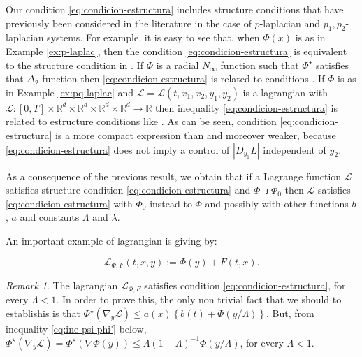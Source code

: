 \documentclass[twoside]{article}
\theoremstyle{remark}
\newtheorem{comentario}{Remark}
\newcounter{example}[section]
\newcommand{\rr}{\mathbb{R}}
\renewcommand{\leq}{\leqslant}
\begin{document}
Our condition \eqref{eq:condicion-estructura} includes structure conditions that have previously been considered in the literature in the case of $p$-laplacian and $p_1,p_2$-laplacian systems. For example, it is easy to see that, when $\Phi(x)$ is as in Example \ref{ex:p-laplac}, then  the condition \eqref{eq:condicion-estructura}  is equivalent to the structure condition in  \cite[Th. 1.4]{mawhin2010critical}.  If $\Phi$ is a radial $N_{\infty}$ function such that $\Phi^{\star}$ satisfies that $\Delta_2$ function  then \eqref{eq:condicion-estructura} is related to conditions  \cite[Eq. (2)-(4)]{ABGMS2015}.   If $\Phi$ is as in Example \ref{ex:pq-laplac} and $\mathcal{L}=\mathcal{L}(t,x_1,x_2,y_1,y_2)$ is a lagrangian with $\mathcal{L}:[0,T]\times\rr^d\times\rr^d\times\rr^d\times\rr^d\to\rr$ then inequality \eqref{eq:condicion-estructura} is related to estructure conditions like
\cite[Lemma 3.1, Eq. (3.1)]{Tian2007192}. As can be seen, condition \eqref{eq:condicion-estructura} is a more compact expression than \cite[Lemma 3.1, Eq. (3.1)]{Tian2007192} and moreover   weaker, because  \eqref{eq:condicion-estructura} does not imply a control of
$|D_{y_1}L|$ independent of $y_2$. 



As a consequence of the previous result, we obtain that if a Lagrange function $\mathcal{L}$ satisfies structure condition \eqref{eq:condicion-estructura} and $\Phi\strictif \Phi_0$ then $\mathcal{L}$ satisfies \eqref{eq:condicion-estructura} with $\Phi_0$ instead to $\Phi$ and possibly with other functions $b$, $a$ and constants $\Lambda$ and $\lambda$.


An important example of lagrangian  is giving by:

\begin{equation}\label{eq:lagrange_phi}
\mathcal{L}_{\Phi,F}(t,x,y):=\Phi(y)+F(t,x).
\end{equation}


\begin{comentario}\label{com:lphi-satis S}
 The lagrangian $\mathcal{L}_{\Phi,F}$ satisfies condition  \eqref{eq:condicion-estructura}, for every $\Lambda<1$. In order to prove this, the only non trivial fact that we should to establishis is that $ \Phi^{\star}(\nabla_{y}\mathcal{L})
\leq
a(x)\left\{b(t)+ \Phi\left({y}/{\Lambda}\right)\right\}$. But, from inequality \eqref{eq:ine-psi-phi'} below, 
$\Phi^{\star}(\nabla_{y}\mathcal{L})=\Phi^{\star}\left(\nabla\Phi(y)\right)\leq \Lambda(1-\Lambda)^{-1} \Phi(y/\Lambda )$, for every $\Lambda<1$.
\end{comentario}
\end{document}
